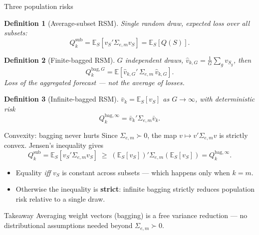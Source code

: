 \documentclass[11pt,aspectratio=169]{beamer}
\newcommand{\Sig}{\Sigma_{e,m}}
\newcommand{\Qsub}{Q_k^{\mathrm{sub}}}
\newcommand{\Qbag}{Q_k^{\mathrm{bag},\infty}}
\newcommand{\QbagG}{Q_k^{\mathrm{bag},G}}
\newcommand{\E}{\mathbb{E}}
\newtheorem{definitionX}{Definition}
\begin{document}
\begin{frame}{Three population risks}
  \begin{definitionX}[Average-subset RSM]
    Single random draw, expected loss over all subsets:
    \[
      \Qsub=\E_S[v_S'\Sig v_S]=\E_S[Q(S)].
    \]
  \end{definitionX}
  \begin{definitionX}[Finite-bagged RSM]
    $G$ independent draws, $\hat v_{k,G}=\tfrac1G\sum_g v_{S_g}$, then
    \[
      \QbagG=\E[\hat v_{k,G}'\,\Sig\,\hat v_{k,G}].
    \]
    \footnotesize Loss of the \emph{aggregated} forecast --- not the average of losses.
  \end{definitionX}
  \begin{definitionX}[Infinite-bagged RSM]
    $\bar v_k=\E_S[v_S]$ as $G\to\infty$, with deterministic risk
    \[
      \Qbag=\bar v_k'\Sig\bar v_k.
    \]
  \end{definitionX}
\end{frame}

\begin{frame}{Convexity: bagging never hurts}
  Since $\Sig\succ 0$, the map $v\mapsto v'\Sig v$ is strictly convex.
  Jensen's inequality gives
  \[
    \Qsub=\E_S[v_S'\Sig v_S]
    \;\ge\;
    (\E_S[v_S])'\Sig(\E_S[v_S])=\Qbag .
  \]

  \begin{itemize}
    \item Equality \emph{iff} $v_S$ is constant across subsets ---
      which happens only when $k=m$.
    \item Otherwise the inequality is \textbf{strict}: infinite bagging
      strictly reduces population risk relative to a single draw.
  \end{itemize}

  \begin{exampleblock}{Takeaway}
    Averaging weight vectors (bagging) is a free variance reduction ---
    no distributional assumptions needed beyond $\Sig\succ0$.
  \end{exampleblock}
\end{frame}
\end{document}
